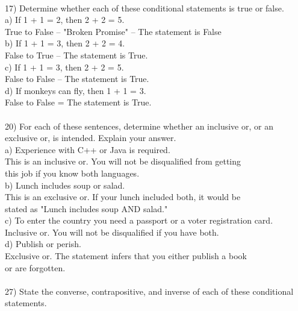 \documentclass{article}
\begin{document}
\begin{flushleft}
~\\\setlength\parindent{0pt}17) Determine whether each of these conditional statements is true or false.\\
\setlength\parindent{24pt}a) If 1 + 1 = 2, then 2 + 2 = 5.\\
\setlength\parindent{48pt} True to False -- "Broken Promise" -- The statement is False\\
\setlength\parindent{24pt}b) If 1 + 1 = 3, then 2 + 2 = 4.\\
\setlength\parindent{48pt} False to True -- The statement is True.\\
\setlength\parindent{24pt}c) If 1 + 1 = 3, then 2 + 2 = 5. \\
\setlength\parindent{48pt} False to False -- The statement is True.\\
\setlength\parindent{24pt}d) If monkeys can fly, then 1 + 1 = 3. \\ 
\setlength\parindent{48pt}False to False = The statement is True. \\  
~\\
\setlength\parindent{0pt}20) For each of these sentences, determine whether an inclusive or, or an exclusive or, is intended.  Explain your answer.\\
\setlength\parindent{24pt}a) Experience with C++ or Java is required.\\
\setlength\parindent{48pt} This is an inclusive or.  You will not be disqualified from getting \\
\setlength\parindent{48pt}this job if you know both languages.\\
\setlength\parindent{24pt}b) Lunch includes soup or salad.\\
\setlength\parindent{48pt}This is an exclusive or.  If your lunch included both, it would be \\
\setlength\parindent{48pt}stated as "Lunch includes soup AND salad."\\
\setlength\parindent{24pt}c) To enter the country you need a passport or a voter registration card.\\
\setlength\parindent{48pt} Inclusive or.  You will not be disqualified if you have both.\\
\setlength\parindent{24pt}d) Publish or perish.\\
\setlength\parindent{48pt} Exclusive or.  The statement infers that you either publish a book \\
\setlength\parindent{48pt}or are forgotten.\\
~\\\setlength\parindent{0pt}27) State the converse, contrapositive, and inverse of each of these conditional statements.\\

\end{flushleft}
\end{document}
